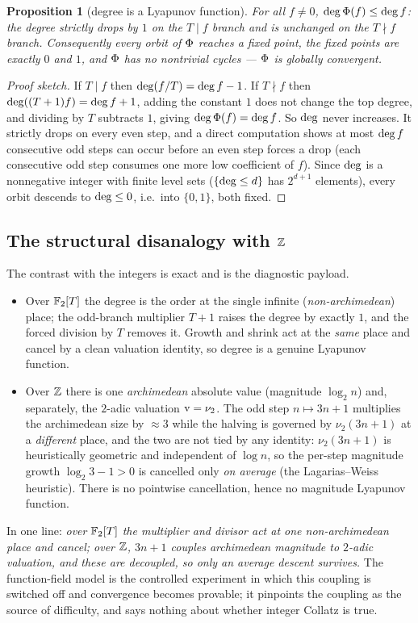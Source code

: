 \documentclass[11pt]{amsart}
\newtheorem{proposition}[theorem]{Proposition}
\theoremstyle{definition}
\theoremstyle{remark}
\begin{document}
\begin{proposition}[degree is a Lyapunov function]\label{prop:degree}
For all $f\ne0$, $\deg\Phi(f)\le\deg f$: the degree strictly drops by $1$ on the
$T\mid f$ branch and is unchanged on the $T\nmid f$ branch. Consequently every orbit of $\Phi$
reaches a fixed point, the fixed points are exactly $0$ and $1$, and $\Phi$ has no nontrivial
cycles --- $\Phi$ is globally convergent.
\end{proposition}
\begin{proof}[Proof sketch]
If $T\mid f$ then $\deg(f/T)=\deg f-1$. If $T\nmid f$ then $\deg((T+1)f)=\deg f+1$, adding
the constant $1$ does not change the top degree, and dividing by $T$ subtracts $1$, giving
$\deg\Phi(f)=\deg f$. So $\deg$ never increases. It strictly drops on every even step, and
a direct computation shows at most $\deg f$ consecutive odd steps can occur before an even step
forces a drop (each consecutive odd step consumes one more low coefficient of $f$). Since $\deg$ is
a nonnegative integer with finite level sets ($\{\deg\le d\}$ has $2^{d+1}$ elements), every orbit
descends to $\deg\le0$, i.e.\ into $\{0,1\}$, both fixed.
\end{proof}

\subsection{The structural disanalogy with $\mathbb{Z}$}
The contrast with the integers is exact and is the diagnostic payload.
\begin{itemize}
\item Over $\mathbb{F}_2[T]$ the degree is the order at the single infinite (\emph{non-archimedean}) place;
the odd-branch multiplier $T+1$ raises the degree by exactly $1$, and the forced division by $T$
removes it. Growth and shrink act at the \emph{same} place and cancel by a clean valuation identity,
so degree is a genuine Lyapunov function.
\item Over $\mathbb{Z}$ there is one \emph{archimedean} absolute value (magnitude $\log_2 n$) and, separately,
the $2$-adic valuation $\operatorname{v}=\nu_2$. The odd step $n\mapsto3n+1$ multiplies the archimedean size by
$\approx3$ while the halving is governed by $\nu_2(3n+1)$ at a \emph{different} place, and the two are
not tied by any identity: $\nu_2(3n+1)$ is heuristically geometric and independent of $\log n$, so the
per-step magnitude growth $\log_2 3-1>0$ is cancelled only \emph{on average} (the Lagarias--Weiss
heuristic). There is no pointwise cancellation, hence no magnitude Lyapunov function.
\end{itemize}
In one line: \emph{over $\mathbb{F}_2[T]$ the multiplier and divisor act at one non-archimedean place and
cancel; over $\mathbb{Z}$, $3n+1$ couples archimedean magnitude to $2$-adic valuation, and these are
decoupled, so only an average descent survives.} The function-field model is the controlled
experiment in which this coupling is switched off and convergence becomes provable; it pinpoints the
coupling as the source of difficulty, and says nothing about whether integer Collatz is true.
\end{document}
